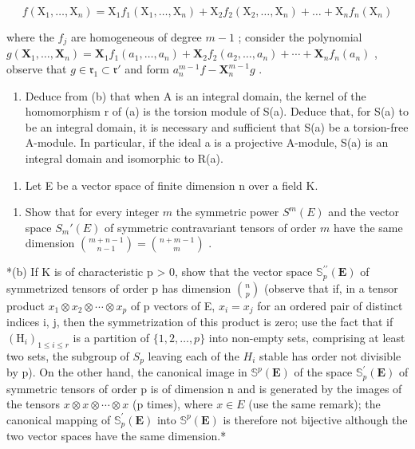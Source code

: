\[
f \left(\mathrm{X} _ {1}, \dots , \mathrm{X} _ {n}\right) = \mathrm{X} _ {1} f _ {1} \left(\mathrm{X} _ {1}, \dots , \mathrm{X} _ {n}\right) + \mathrm{X} _ {2} f _ {2} \left(\mathrm{X} _ {2}, \dots , \mathrm{X} _ {n}\right) + \dots + \mathrm{X} _ {n} f _ {n} \left(\mathrm{X} _ {n}\right)
\]

where the \(f_{j}\) are homogeneous of degree \(m - 1\) ; consider the polynomial \(g(\mathbf{X}_1, \ldots, \mathbf{X}_n) = \mathbf{X}_1 f_1(a_1, \ldots, a_n) + \mathbf{X}_2 f_2(a_2, \ldots, a_n) + \cdots + \mathbf{X}_n f_n(a_n)\) , observe that \(g \in \mathfrak{r}_1 \subset \mathfrak{r}'\) and form \(a_n^{m-1} f - \mathbf{X}_n^{m-1} g\) .

\begin{enumerate}
\def\labelenumi{(\alph{enumi})}
\setcounter{enumi}{2}
\tightlist
\item
  Deduce from (b) that when A is an integral domain, the kernel of the homomorphism r of (a) is the torsion module of S(a). Deduce that, for S(a) to be an integral domain, it is necessary and sufficient that S(a) be a torsion-free A-module. In particular, if the ideal a is a projective A-module, S(a) is an integral domain and isomorphic to R(a).
\end{enumerate}

\begin{enumerate}
\def\labelenumi{\arabic{enumi}.}
\setcounter{enumi}{4}
\tightlist
\item
  Let E be a vector space of finite dimension n over a field K.
\end{enumerate}

\begin{enumerate}
\def\labelenumi{(\alph{enumi})}
\tightlist
\item
  Show that for every integer \(m\) the symmetric power \(S^m(E)\) and the vector space \(S_m'(E)\) of symmetric contravariant tensors of order \(m\) have the same dimension \(\binom{m + n - 1}{n - 1} = \binom{n + m - 1}{m}\) .
\end{enumerate}

*(b) If K is of characteristic p \textgreater{} 0, show that the vector space \(\mathbb{S}_{p}^{\prime\prime}(\mathbf{E})\) of symmetrized tensors of order p has dimension \(\binom{n}{p}\) (observe that if, in a tensor product \(x_{1} \otimes x_{2} \otimes \cdots \otimes x_{p}\) of p vectors of E, \(x_{i} = x_{j}\) for an ordered pair of distinct indices i, j, then the symmetrization of this product is zero; use the fact that if \((\mathrm{H}_{i})_{1 \leqslant i \leqslant r}\) is a partition of \(\{1, 2, \ldots, p\}\) into non-empty sets, comprising at least two sets, the subgroup of \(S_{p}\) leaving each of the \(H_{i}\) stable has order not divisible by p). On the other hand, the canonical image in \(\mathbb{S}^{p}(\mathbf{E})\) of the space \(\mathbb{S}_{p}^{\prime}(\mathbf{E})\) of symmetric tensors of order p is of dimension n and is generated by the images of the tensors \(x \otimes x \otimes \cdots \otimes x\) (p times), where \(x \in E\) (use the same remark); the canonical mapping of \(\mathbb{S}_{p}^{\prime}(\mathbf{E})\) into \(\mathbb{S}^{p}(\mathbf{E})\) is therefore not bijective although the two vector spaces have the same dimension.*

